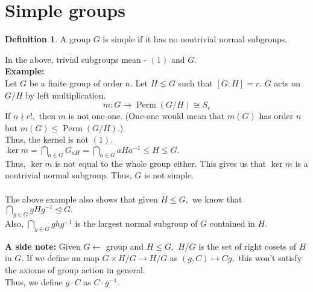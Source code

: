 \documentclass[12 pt, a4paper, toc=graduated, oneside]{article}
\theoremstyle{definition}
\newtheorem{defn}{Definition}
\begin{document}
\section{Simple groups}
\begin{defn}
	A group $G$ is simple if it has no nontrivial normal subgroups.
\end{defn}
In the above, trivial subgroups mean - $(1)$ and $G.$\\
\textbf{Example:}\\
Let $G$ be a finite group of order $n.$ Let $H \lneq G$ such that $[G:H] = r.$ $G$ acts on $G/H$ by left multiplication.\\
\[m : G \longrightarrow \operatorname{Perm}(G/H) \cong S_r\]
If $n \nmid r!,$ then $m$ is not one-one. (One-one would mean that $m(G)$ has order $n$ but $m(G) \le \operatorname{Perm}(G/H).$)\\
Thus, the kernel is not $(1).$\\
$\ker m = \displaystyle\bigcap_{a \in G}G_{aH} = \displaystyle\bigcap_{a \in G}aHa^{-1} \le H \lneq G.$\\
Thus, $\ker m$ is not equal to the whole group either. This gives us that $\ker m$ is a nontrivial normal subgroup. Thus, $G$ is not simple.\\~\\
The above example also shows that given $H\le G,$ we know that $\displaystyle\bigcap_{g\in G}gHg^{-1} \trianglelefteq G.$\\
Also, $\displaystyle\bigcap_{g \in G}ghg^{-1}$ is the largest normal subgroup of $G$ contained in $H.$

\hrulefill

\textbf{A side note:} Given $G \longleftarrow$ group and $H \le G,$ $H/G$ is the set of right cosets of $H$ in $G.$ If we define an map $G \times H/G \to H/G$ as $(g, C) \mapsto Cg,$ this won't satisfy the axioms of group action in general.\\
Thus, we define $g\cdot C$ as $C\cdot g^{-1}.$

\hrulefill
\end{document}
